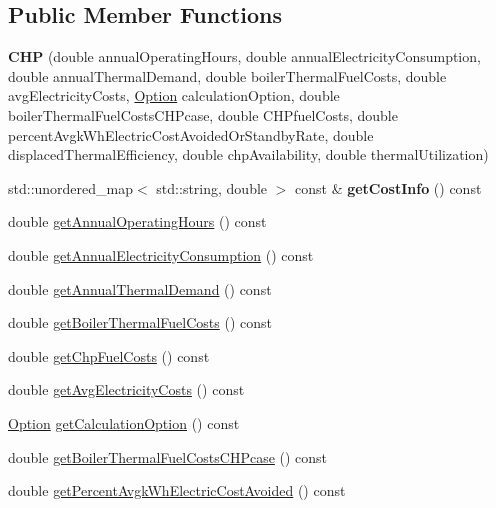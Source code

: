 \subsection*{Public Member Functions}
\begin{DoxyCompactItemize}
\item 
\mbox{\label{class_c_h_p_aea45a2afd5189214fbf720e53d587640}} 
{\bfseries C\+HP} (double annual\+Operating\+Hours, double annual\+Electricity\+Consumption, double annual\+Thermal\+Demand, double boiler\+Thermal\+Fuel\+Costs, double avg\+Electricity\+Costs, \hyperlink{class_c_h_p_ac82f530412021ace928a7e95c1295d06}{Option} calculation\+Option, double boiler\+Thermal\+Fuel\+Costs\+C\+H\+Pcase, double C\+H\+Pfuel\+Costs, double percent\+Avgk\+Wh\+Electric\+Cost\+Avoided\+Or\+Standby\+Rate, double displaced\+Thermal\+Efficiency, double chp\+Availability, double thermal\+Utilization)
\item 
\mbox{\label{class_c_h_p_a9b448b253454087f9e98124aa716715f}} 
std\+::unordered\+\_\+map$<$ std\+::string, double $>$ const  \& {\bfseries get\+Cost\+Info} () const
\item 
double \hyperlink{class_c_h_p_aeeb03f1f40db034babf883a1e00ed2a3}{get\+Annual\+Operating\+Hours} () const
\item 
double \hyperlink{class_c_h_p_a37d544d03c45668a9dc5d502cdcb6137}{get\+Annual\+Electricity\+Consumption} () const
\item 
double \hyperlink{class_c_h_p_a849a576483b92b131ebfc0615e1e0bdb}{get\+Annual\+Thermal\+Demand} () const
\item 
double \hyperlink{class_c_h_p_a9f6c6638b1be7c2df8ba4b406c3b2b94}{get\+Boiler\+Thermal\+Fuel\+Costs} () const
\item 
double \hyperlink{class_c_h_p_a00929ba5d10367258dc1dc437eda88e3}{get\+Chp\+Fuel\+Costs} () const
\item 
double \hyperlink{class_c_h_p_a2bc5ac0eb3d7ce42f77f26b3973f6c9f}{get\+Avg\+Electricity\+Costs} () const
\item 
\hyperlink{class_c_h_p_ac82f530412021ace928a7e95c1295d06}{Option} \hyperlink{class_c_h_p_a858f0201818f637331e0d06d3171bee7}{get\+Calculation\+Option} () const
\item 
double \hyperlink{class_c_h_p_ace1d96aacf328bd62f01e0eceaae19f6}{get\+Boiler\+Thermal\+Fuel\+Costs\+C\+H\+Pcase} () const
\item 
double \hyperlink{class_c_h_p_ad79607b304d1e50a9421de043b7a9e7b}{get\+Percent\+Avgk\+Wh\+Electric\+Cost\+Avoided} () const

\end{DoxyCompactItemize}
